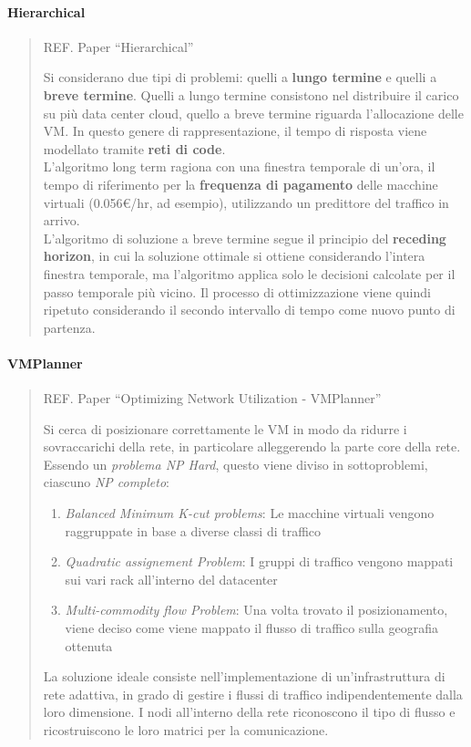 \documentclass{article}
\providecommand{\tightlist}{%
		  \setlength{\itemsep}{0pt}\setlength{\parskip}{0pt}}
\begin{document}
		\paragraph{Hierarchical}
		\begin{quote}
		REF. Paper ``Hierarchical''
		
		Si considerano due tipi di problemi: quelli a \textbf{lungo termine} e quelli a \textbf{breve termine}. Quelli a lungo termine consistono nel distribuire il carico su più data center cloud, quello a	breve termine riguarda l'allocazione delle VM. 
		In questo genere di rappresentazione, il tempo di risposta viene modellato tramite \textbf{reti di	code}.\\
		
		L’algoritmo long term ragiona con una finestra temporale di un’ora, il tempo di riferimento per la \textbf{frequenza di pagamento} delle macchine virtuali (0.056€/hr, ad	esempio), utilizzando un predittore del traffico in arrivo.\\
		
		L'algoritmo di soluzione a breve termine segue il principio del \textbf{receding horizon}, in cui la soluzione ottimale si ottiene considerando l'intera finestra temporale, ma l'algoritmo applica solo le decisioni calcolate per il passo temporale più vicino. Il processo di ottimizzazione viene quindi ripetuto considerando il secondo intervallo di tempo come nuovo punto di partenza.
		\end{quote}
		
		\paragraph{VMPlanner}
		\begin{quote}
		REF. Paper ``Optimizing Network Utilization -
		VMPlanner''
		
		Si cerca di posizionare correttamente le VM in modo da ridurre i sovraccarichi della rete, in particolare alleggerendo la parte core della rete. Essendo un \emph{problema NP Hard}, questo viene diviso in sottoproblemi, ciascuno \emph{NP completo}:
		
		\begin{enumerate}
		\def\labelenumi{\arabic{enumi}.}
		\tightlist
		\item
		  \textit{Balanced Minimum K-cut problems}: Le macchine virtuali vengono raggruppate in base a diverse classi di traffico
		\item
		  \textit{Quadratic assignement Problem}: I gruppi di traffico vengono mappati sui vari rack all’interno del datacenter
		\item
		  \textit{Multi-commodity flow Problem}: Una volta trovato il posizionamento, viene deciso come viene mappato il flusso di
		  traffico sulla geografia ottenuta
		\end{enumerate}
		
		La soluzione ideale consiste nell'implementazione di un'infrastruttura di rete adattiva, in grado di gestire	i flussi di traffico indipendentemente dalla loro dimensione. I nodi all'interno della rete riconoscono il tipo di flusso e
		ricostruiscono le loro matrici per la comunicazione.
		\end{quote}
		
\end{document}
